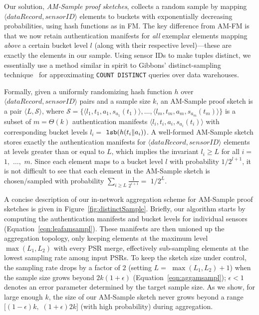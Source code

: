 \documentclass[10pt,twocolumn]{article}
\newcommand{\amfm}{AM-FM\xspace}
\newcommand{\amsampl}{AM-Sample\xspace}
\newcommand{\proofsketch}{proof sketch\xspace}
\newcommand{\proofsketches}{proof sketches\xspace}
\newcommand{\sensorid}{\ensuremath{\mathit{sensorID}}\xspace}
\newcommand{\lsb}{\mbox{\tt lsb}}
\newcommand\calS{\ensuremath{\mathcal S}}
\newcommand{\plevel}{L}
\begin{document}
Our solution, \emph{\amsampl \proofsketches\/}, collects a random sample by
mapping $\langle \mathit{dataRecord}, \sensorid\rangle $ elements to buckets with 
exponentially decreasing probabilities, using hash functions as in FM.  
The key difference from \amfm is that we now retain authentication
manifests for \emph{all} exemplar elements mapping \emph{above} a certain
bucket level $l$ (along with their respective level)---these are exactly 
the elements in our sample. 
Using sensor IDs to make tuples distinct, we essentially use a method
similar in spirit to Gibbons' 
distinct-sampling technique~\cite{Gibbons2001} for approximating
{\tt COUNT DISTINCT} queries over data warehouses.

Formally, given a uniformly randomizing hash function $h$ over
$\langle \mathit{dataRecord}, \sensorid\rangle $ pairs
and a sample size $k$, 
an \amsampl \proofsketch is a pair $\langle \plevel,\calS\rangle $,
where $\calS=\{\langle l_1, t_1, a_1, s_{a_1}(t_1)\rangle , \ldots, \langle l_m, t_m, a_m,
s_{a_m}(t_m)\rangle \}$
is a subset of $m = \Theta(k)$ authentication
manifests $\langle l_i, t_i,a_i, s_{a_i}(t_i)\rangle $ with corresponding 
bucket levels $l_i=$ $\lsb(h(t_i\| a_i))$.
A well-formed \amsampl sketch 
stores exactly the authentication manifests for 
$\langle \mathit{dataRecord}, \sensorid\rangle $ elements at levels greater than or equal to 
$\plevel$, which implies the invariant
$l_i\geq\plevel$ for all $i=$ $1,$ $\ldots,$ $m$.
Since each element maps to a bucket level $l$ with probability 
$1/2^{l+1}$, it is not difficult to see that each element in the 
\amsampl sketch is chosen/sampled with probability 
$\sum_{i\geq L}\frac{1}{2^{i+1}}=$ $1/2^L$.


A concise description of our in-network aggregation scheme for
\amsampl \proofsketches  is given in Figure~\ref{fig:distinctSample}.
Briefly, our algorithm starts
by computing the authentication manifests and bucket levels for 
individual sensors (Equation~\ref{eqn:leafamsampl}).
These manifests are then unioned up the aggregation topology, only
keeping elements at the maximum level
$\max(L_1, L_2)$ with every PSR merge, effectively sub-sampling elements
at the lowest sampling rate among input PSRs.  To keep the
sketch size under control, the sampling 
rate drops by a factor of $2$ (setting $L=$  $\max(L_1, L_2)+1$) when the 
sample size grows beyond $2k(1+\epsilon)$ (Equation~\ref{eqn:aggamsampl});
$\epsilon<1$ denotes an error parameter determined by the target
sample size.
As we show, for large enough $k$, the size of our
\amsampl sketch never grows beyond a range $[(1-\epsilon)k,$ $(1+\epsilon)2k]$ 
(with high probability) during aggregation.
\end{document}
